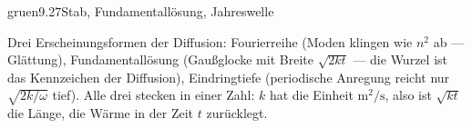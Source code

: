 \begin{loesungkarte}{gruen}{9.27}{Stab, Fundamentallösung, Jahreswelle}
\begin{mitnehmen}\kastentext
Drei Erscheinungsformen der Diffusion: Fourierreihe (Moden klingen wie $n^{2}$ ab --- Glättung), Fundamentallösung (Gaußglocke mit Breite $\sqrt{2kt}$ --- die Wurzel ist das Kennzeichen der Diffusion), Eindringtiefe (periodische Anregung reicht nur $\sqrt{2k/\omega}$ tief). Alle drei stecken in einer Zahl: $k$ hat die Einheit $\mathrm{m^{2}/s}$, also ist $\sqrt{kt}$ die Länge, die Wärme in der Zeit $t$ zurücklegt.
\end{mitnehmen}
\end{loesungkarte}


